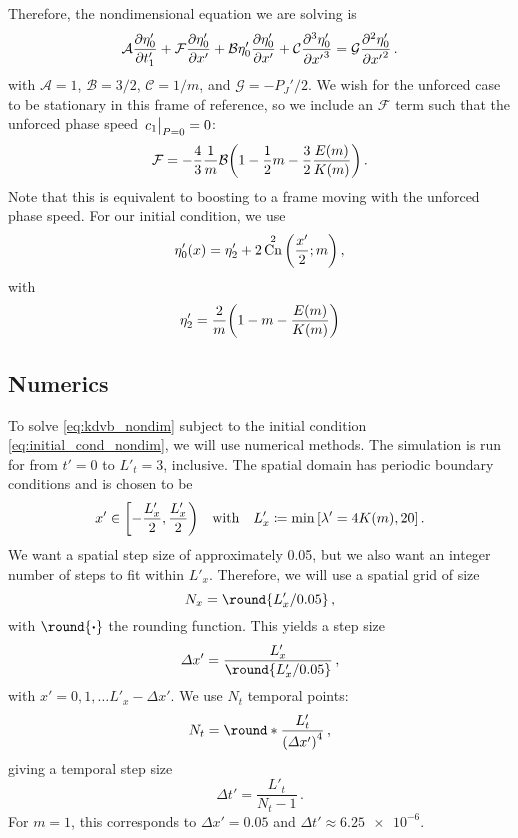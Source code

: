 \documentclass{jfm}
\let\Oldsubsection\subsection
\renewcommand{\subsection}{\FloatBarrier\Oldsubsection}
\DeclareMathOperator{\cn}{Cn}
\DeclarePairedDelimiter{\round}\lfloor\rceil
\begin{document}
Therefore, the nondimensional equation we are solving is
\begin{equation}
  \mathcal{A} \pdv{\eta'_0}{t'_1} + \mathcal{F} \pdv{\eta'_0}{x'} + \mathcal{B}
  \eta'_0 \pdv{\eta'_0}{x'} + \mathcal{C} \pdv[3]{\eta'_0}{{x'}} =
  \mathcal{G} \pdv[2]{\eta'_0}{{x'}} \,.
  \label{eq:kdvb_nondim}
\end{equation}
with $\mathcal{A} = 1$, $\mathcal{B} = 3/2$, $\mathcal{C} = 1/m$, and
$\mathcal{G} = -P_J'/2$.
We wish for the unforced case to be stationary in this frame of
reference, so we include an $\mathcal{F}$ term such that the unforced
phase speed $\eval{c_1}_{P=0} = 0$:
\begin{equation}
  \mathcal{F} = -\frac{4}{3} \frac{1}{m} \mathcal{B}
    \pqty{1 - \frac{1}{2} m - \frac{3}{2} \frac{E(m)}{K(m)}} \,.
\end{equation}
Note that this is equivalent to boosting to a frame moving with the
unforced phase speed.
For our initial condition, we use
\begin{equation}
  \eta'_0(x) = \eta'_2 + 2 \cn^2\pqty{\frac{x'}{2}; m} \,,
  \label{eq:initial_cond_nondim}
\end{equation}
with
\begin{equation}
  \eta'_2 = \frac{2}{m} \pqty{1 - m - \frac{E(m)}{K(m)}}
\end{equation}

\subsection{Numerics}
To solve \cref{eq:kdvb_nondim} subject to the initial condition
\cref{eq:initial_cond_nondim}, we will use numerical methods.
The simulation is run for from $t'= 0$ to $L'_t = 3$, inclusive.
The spatial domain has periodic boundary conditions and is chosen to be
\begin{equation}
  x' \in \biggl[-\frac{L'_x}{2},
    \frac{L'_x}{2} \biggr)
  \qq{with}
  L'_x \coloneqq \min \bqty{\lambda'=4K(m) , 20} \,.
\end{equation}
We want a spatial step size of approximately \num{0.05}, but we also
want an integer number of steps to fit within $L'_x$.
Therefore, we will use a spatial grid of size
\begin{equation}
  N_x = \round{L'_x/0.05} \,,
\end{equation}
with $\round{\vdot}$ the rounding function.
This yields a step size
\begin{equation}
  \Delta x' = \frac{L'_x}
    {\round{L'_x/0.05}} \,,
\end{equation}
with $x' = 0, 1, \ldots L'_x - \Delta x'$.
We use $N_t$ temporal points:
\begin{equation}
  N_t =  \round*{\frac{L'_t}{\pqty{\Delta x'}^4}} \,,
\end{equation}
giving a temporal step size
\begin{equation}
  \Delta t' = \frac{L'_t}{N_t -1} \,.
\end{equation}
For $m=1$, this corresponds to $\Delta x' = \num{0.05}$ and $\Delta t'
\approx \num{6.25e-6}$.
\end{document}
